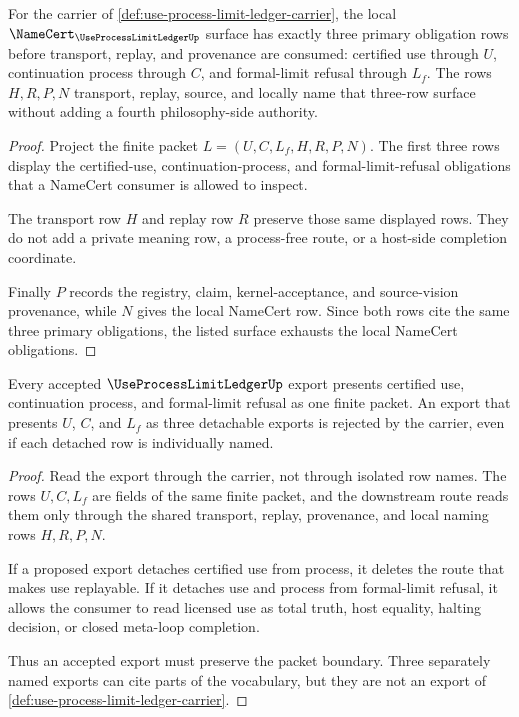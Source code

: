 \begin{theorem}
\label{thm:use-process-limit-ledger-namecert-obligations}
For the carrier of \autoref{def:use-process-limit-ledger-carrier}, the local $\NameCert_{\UseProcessLimitLedgerUp}$ surface has exactly three primary obligation rows before transport, replay, and provenance are consumed: certified use through $U$, continuation process through $C$, and formal-limit refusal through $L_f$. The rows $H,R,P,N$ transport, replay, source, and locally name that three-row surface without adding a fourth philosophy-side authority.
\end{theorem}
\begin{proof}
Project the finite packet $L=(U,C,L_f,H,R,P,N)$. The first three rows display the certified-use, continuation-process, and formal-limit-refusal obligations that a NameCert consumer is allowed to inspect.

The transport row $H$ and replay row $R$ preserve those same displayed rows. They do not add a private meaning row, a process-free route, or a host-side completion coordinate.

Finally $P$ records the registry, claim, kernel-acceptance, and source-vision provenance, while $N$ gives the local NameCert row. Since both rows cite the same three primary obligations, the listed surface exhausts the local NameCert obligations.
\end{proof}

\begin{theorem}
\label{thm:use-process-limit-ledger-export-boundary}
Every accepted $\UseProcessLimitLedgerUp$ export presents certified use, continuation process, and formal-limit refusal as one finite packet. An export that presents $U$, $C$, and $L_f$ as three detachable exports is rejected by the carrier, even if each detached row is individually named.
\end{theorem}
\begin{proof}
Read the export through the carrier, not through isolated row names. The rows $U,C,L_f$ are fields of the same finite packet, and the downstream route reads them only through the shared transport, replay, provenance, and local naming rows $H,R,P,N$.

If a proposed export detaches certified use from process, it deletes the route that makes use replayable. If it detaches use and process from formal-limit refusal, it allows the consumer to read licensed use as total truth, host equality, halting decision, or closed meta-loop completion.

Thus an accepted export must preserve the packet boundary. Three separately named exports can cite parts of the vocabulary, but they are not an export of \autoref{def:use-process-limit-ledger-carrier}.
\end{proof}

